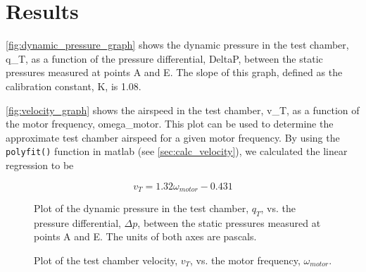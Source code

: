 \chapter{Results}
\label{cp:results}

\autoref{fig:dynamic_pressure_graph} shows the dynamic pressure in the test chamber, \gls{q_T}, as a function of the pressure differential, \gls{DeltaP}, between the static pressures measured at points A and E. The slope of this graph, defined as the calibration constant, \gls{K}, is \num{1.08}.

\autoref{fig:velocity_graph} shows the airspeed in the test chamber, \gls{v_T}, as a function of the motor frequency, \gls{omega_motor}. This plot can be used to determine the approximate test chamber airspeed for a given motor frequency. By using the \verb|polyfit()| function in \acrshort{matlab} (see \autoref{sec:calc_velocity}), we calculated the linear regression to be

\begin{equation}\label{eq:velocity_regression}
    v_T = 1.32\omega_{motor}-0.431
\end{equation}

\begin{figure}[htpb]
    \centering
    
    \caption[Plot of dynamic pressure vs. the pressure differential]{Plot of the dynamic pressure in the test chamber, $q_T$, vs. the pressure differential, $\Delta{}p$, between the static pressures measured at points A and E. The units of both axes are pascals.}
    \label{fig:dynamic_pressure_graph}
\end{figure}

\begin{figure}[htpb]
    \centering
    
    \caption[Plot of test chamber velocity vs. the motor frequency]{Plot of the test chamber velocity, $v_T$, vs. the motor frequency, $\omega_{motor}$.}
    \label{fig:velocity_graph}
\end{figure}
